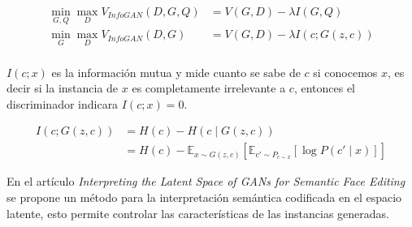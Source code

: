    {\small
        \begin{equation}
            \begin{split}
                \min_{G,Q}\max_{D} V_{InfoGAN}(D,G,Q)   &= V(G,D) - \lambda I(G,Q)      \\
                \min_{G}\max_{D} V_{InfoGAN}(D,G)       &= V(G,D) - \lambda I(c;G(z,c)) \\
            \end{split}
            \label{eq:InfoGAN}
        \end{equation}
    }

${I(c;x)}$ es la información mutua y mide cuanto se sabe de ${c}$ si conocemos ${x}$, es decir si la instancia de $x$ es completamente irrelevante a ${c}$, entonces el discriminador indicara ${I(c;x) = 0}$.

    {\small
        \begin{equation}
            \begin{split}
                I(c; G(z,c))    &=  H(c) - H(c \mid G(z,c))     \\
                &=  H(c) - \mathbb{E}_{x\sim{}G(z,c)}\left[\mathbb{E}_{c'\sim{}P_{c\sim{}x}} \left[ \log{P(c'\mid{}x)}\right]\right]
            \end{split}
        \end{equation}
    }

En el artículo \textit{Interpreting the Latent Space of GANs for Semantic Face Editing} \cite{GANLatentSpace-shen2020interpreting} se propone un método para la interpretación semántica codificada en el espacio latente, esto permite controlar las características de las instancias generadas.






